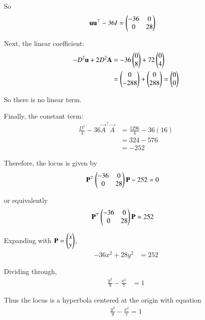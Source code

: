 \documentclass[journal]{IEEEtran}
\begin{document}
So
\begin{align}
    \mathbf{u}\mathbf{u}^\top - 36I &= \begin{pmatrix}-36 & 0 \\ 0 & 28\end{pmatrix}
\end{align}

Next, the linear coefficient:
\begin{align}
    -D^2\mathbf{u} + 2D^2\mathbf{A}
    &= -36\begin{pmatrix}0\\8\end{pmatrix} + 72\begin{pmatrix}0\\4\end{pmatrix} \\
    &= \begin{pmatrix}0\\-288\end{pmatrix} + \begin{pmatrix}0\\288\end{pmatrix} = \begin{pmatrix}0\\0\end{pmatrix}
\end{align}

So there is no linear term.

Finally, the constant term:
\begin{align}
    \frac{D^4}{4} - 36\vec{A}^\top\vec{A}
    &= \frac{1296}{4} - 36(16) \\
    &= 324 - 576 \\
    &= -252
\end{align}

Therefore, the locus is given by
\begin{align}
    \mathbf{P}^\top\begin{pmatrix}-36 & 0 \\ 0 & 28\end{pmatrix}\mathbf{P} - 252 &= 0
\end{align}

or equivalently
\begin{align}
    \mathbf{P}^\top\begin{pmatrix}-36 & 0 \\ 0 & 28\end{pmatrix}\mathbf{P} &= 252
\end{align}

Expanding with $\mathbf{P}=\begin{pmatrix}x\\y\end{pmatrix}$,
\begin{align}
    -36x^2 + 28y^2 &= 252
\end{align}

Dividing through,
\begin{align}
    \frac{y^2}{9} - \frac{x^2}{7} &= 1
\end{align}

Thus the locus is a hyperbola centered at the origin with equation
\begin{align}
    \frac{y^2}{9} - \frac{x^2}{7} = 1
\end{align}
\end{document}
